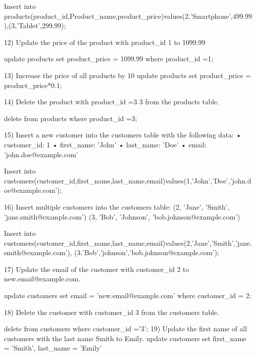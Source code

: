 Insert into products(product_id,Product_name,product_price)values(2,'Smartphone',499.99),(3,'Tablet',299.99);

12) Update the price of the product with product_id 1 to 1099.99

update products
set product_price = 1099.99
where product_id =1;

13) Increase the price of all products by 10%
update products
set product_price = product_price*0.1;

14) Delete the product with product_id =3 3 from the products table.

delete from products
where product_id =3;

15) Insert a new customer into the customers table with the following data:
• customer_id: 1
• first_name: 'John'
• last_name: 'Doe'
• email: 'john.doe@example.com'

Insert into customers(customer_id,first_name,last_name,email)values(1,'John','Doe','john.doe@example.com');

16) Insert multiple customers into the customers table:
(2, 'Jane', 'Smith', 'jane.smith@example.com')
(3, 'Bob', 'Johnson', 'bob.johnson@example.com')

Insert into customers(customer_id,first_name,last_name,email)values(2,'Jane','Smith','jane.smith@example.com'),
(3,'Bob','johnson','bob.johnson@example.com');

17) Update the email of the customer with customer_id 2 to new.email@example.com.

update customers
set email = 'new.email@example.com'
where customer_id = 2;

18) Delete the customer with customer_id 3 from the customers table.

delete from customers
where customer_id ='3';
19) Update the first name of all customers with the last name Smith to Emily.
update customers
set first_name = 'Smith',
last_name = 'Emily'
